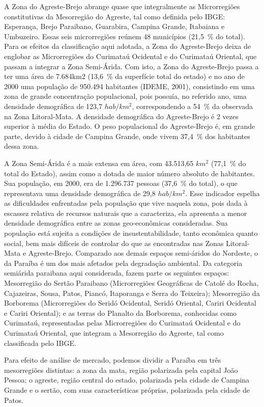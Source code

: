 	A Zona do Agreste-Brejo abrange quase que integralmente as Microrregiões constitutivas da Mesorregião do Agreste, tal como definida pelo IBGE: Esperança, Brejo Paraibano, Guarabira, Campina Grande, Itabaiana e Umbuzeiro. Essas seis microrregiões reúnem 48 municípios (21,5~\% do total). Para os efeitos da classificação aqui adotada, a Zona do Agreste-Brejo deixa de englobar as Microrregiões do Curimataú Ocidental e do Curimataú Oriental, que passam a integrar a Zona Semi-Árida. Com isto, a Zona do Agreste-Brejo passa a ter uma área de 7.684km2 (13,6~\% da superfície total do estado) e no ano de 2000 uma população de 950.494 habitantes (IDEME, 2001), consistindo em uma zona de grande concentração populacional, pois possuía, no referido ano, uma densidade demográfica de 123,7 $hab/km^2$, correspondendo a 54~\% da observada na Zona Litoral-Mata. A densidade demográfica do Agreste-Brejo é 2 vezes superior à média do Estado. O peso populacional do Agreste-Brejo é, em grande parte, devido à cidade de Campina Grande, onde vivem 37,4~\% dos habitantes dessa zona.

	A Zona Semi-Árida é a mais extensa em área, com 43.513,65 $km^2$ (77,1~\% do total do Estado), assim como a dotada de maior número absoluto de habitantes. Sua população, em 2000, era de 1.296.737 pessoas (37,6~\% do total), o que representava uma densidade demográfica de 29,8 $hab/km^2$. Esse indicador espelha as dificuldades enfrentadas pela população que vive naquela zona, pois dada à escassez relativa de recursos naturais que a caracteriza, ela apresenta a menor densidade demográfica entre as zonas geo-econômicas consideradas. Sua população está sujeita a condições de insustentabilidade, tanto econômica quanto social, bem mais difíceis de controlar do que as encontradas nas Zonas Litoral-Mata e Agreste-Brejo. Comparado aos demais espaços semi-áridos do Nordeste, o da Paraíba é um dos mais afetados pela degradação ambiental. Da categoria semiárida paraibana aqui considerada, fazem parte os seguintes espaços: Mesorregião do Sertão Paraibano (Microrregiões Geográficas de Catolé do Rocha, Cajazeiras, Sousa, Patos, Piancó, Itaporanga e Serra do Teixeira); Mesorregião da Borborema (Microrregiões do Seridó Ocidental, Seridó Oriental, Cariri Ocidental e Cariri Oriental); e as terras do Planalto da Borborema, conhecidas como Curimataú, representadas pelas Microrregiões do Curimataú Ocidental e do Curimataú Oriental, que integram a Mesorregião do Agreste, tal como classificada pelo IBGE.

	Para efeito de análise de mercado, podemos dividir a Paraíba em três mesorregiões distintas: a zona da mata, região polarizada pela capital João Pessoa; o agreste, região central do estado, polarizada pela cidade de Campina Grande e o sertão, com suas características próprias, polarizada pela cidade de Patos.

